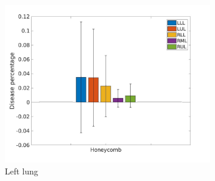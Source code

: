 \begin{figure}[H]
\begin{subfigure}{.46\linewidth}
  \includegraphics[width=\linewidth,trim={{.0\wd0} {.0\wd0} {.0\wd0} {.0\wd0}},clip]{QuantitativeAnalysis/Image/HoneycombLobarRegionDiseaseDistribution.jpg} %
  \caption{Left lung}
  \label{fig:LobarRegionDiseaseDistribution-c} 
\end{subfigure} 
\hspace{.3in}
\begin{subfigure}{.46\linewidth}%

\end{subfigure}
\end{figure}
